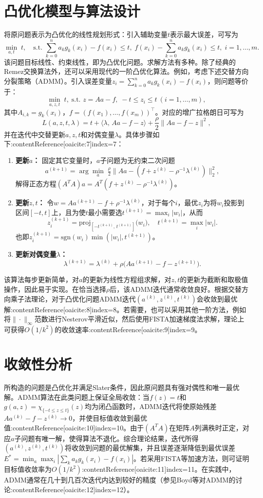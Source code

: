 \documentclass{article}
\begin{document}
\section{凸优化模型与算法设计}
将原问题表示为凸优化的线性规划形式：引入辅助变量$t$表示最大误差，可写为
\[
\min_{a,t}\; t,\quad
\text{s.t. } \sum_{k=0}^n a_k g_k(x_i)-f(x_i)\le t,\;
f(x_i)-\sum_{k=0}^n a_k g_k(x_i)\le t,\; i=1,\dots,m.
\]
该问题目标线性、约束线性，即为凸优化问题。求解方法有多种。除了经典的Remez交换算法外，还可以采用现代的一阶凸优化算法。例如，考虑下述交替方向分裂策略（ADMM）。引入误差变量$z_i=\sum_{k=0}^n a_k g_k(x_i)-f(x_i)$，则问题等价于：
\[
\min_{a,z,t}\; t,\;\text{s.t. } z=A a - f,\; -t\le z_i\le t\ (i=1,\dots,m),
\]
其中$A_{i,k}=g_k(x_i)$，$f=(f(x_1),\dots,f(x_m))^\top$。对应的增广拉格朗日可写为
\[
L(a,z,t,\lambda)=t+\langle\lambda,\,A a - f - z\rangle+\frac{\rho}{2}\|A a - f - z\|^2,
\]
并在迭代中交替更新$a,z,t$和对偶变量$\lambda$。具体步骤如下:contentReference[oaicite:7]{index=7}：
\begin{enumerate}
  \item \textbf{更新$a$：} 固定其它变量时，$a$子问题为无约束二次问题
  \[
  a^{(k+1)}=\arg\min_a\;\tfrac{\rho}{2}\|A a - (f+z^{(k)}-\rho^{-1}\lambda^{(k)})\|_2^2,
  \]
  解得正态方程$(A^TA)a = A^T(f+z^{(k)}-\rho^{-1}\lambda^{(k)})$。
  \item \textbf{更新$z,t$：} 令$w=A a^{(k+1)}-f+\rho^{-1}\lambda^{(k)}$，对于每个$i$，最优$z_i$为将$w_i$投影到区间$[-t,t]$上，且为使$t$最小需要选$t^{(k+1)}=\max_i|w_i|$，从而
  \[
  z_i^{(k+1)} = \mathrm{proj}_{[-t^{(k+1)},\,t^{(k+1)}]}\bigl(w_i\bigr),\quad
  t^{(k+1)}=\max_i|w_i|.
  \]
  也即$z_i^{(k+1)}=\mathrm{sgn}(w_i)\min(|w_i|,t^{(k+1)})$。
  \item \textbf{更新对偶变量$\lambda$：} 
  \[
  \lambda^{(k+1)}=\lambda^{(k)}+\rho\bigl(A a^{(k+1)}-f - z^{(k+1)}\bigr).
  \]
\end{enumerate}
该算法每步更新简单，对$a$的更新为线性方程组求解，对$z,t$的更新为截断和取极值操作，因此易于实现。在恰当选择$\rho$后，该ADMM迭代通常收敛良好。根据交替方向乘子法理论，对于凸优化问题ADMM迭代$(a^{(k)},z^{(k)},t^{(k)})$会收敛到最优解:contentReference[oaicite:8]{index=8}。若需要，也可以采用其他一阶方法，例如将$\|\cdot\|_\infty$范数进行Nesterov平滑近似，然后使用FISTA加速梯度法求解，理论上可获得$O(1/k^2)$的收敛速率:contentReference[oaicite:9]{index=9}。

\section{收敛性分析}
所构造的问题是凸优化并满足Slater条件，因此原问题具有强对偶性和唯一最优解。ADMM算法在此类问题上保证全局收敛：当$f(z)=t$和$g(a,z)=\chi_{\{-t\le z\le t\}}(z)$均为闭凸函数时，ADMM迭代将使原始残差$A a^{(k)}-f-z^{(k)}\to0$，并使目标值收敛到最优值:contentReference[oaicite:10]{index=10}。由于$(A^TA)$在矩阵$A$列满秩时正定，对应$a$子问题有唯一解，使得算法不退化。综合理论结果，迭代所得$(a^{(k)},z^{(k)},t^{(k)})$将收敛到问题的最优解集，并且误差逐渐降低到最优误差$E^*=\min_{a}\max_i|\sum_k a_k g_k(x_i)-f(x_i)|$。若采用FISTA等加速方法，则可证明目标值收敛率为$O(1/k^2)$:contentReference[oaicite:11]{index=11}。在实践中，ADMM通常在几十到几百次迭代内达到较好的精度（参见Boyd等对ADMM的讨论:contentReference[oaicite:12]{index=12}）。
\end{document}
